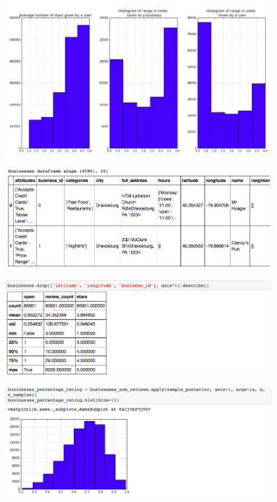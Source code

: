 \documentclass[11pt]{article}
\begin{document}
\begin{figure}[!htb]
\centering
\includegraphics[width=0.9\textwidth]{./ac209/avgstarsusersbusinesses-filter.png}
\end{figure}

\begin{figure}[!htb]
\centering
\includegraphics[width=0.9\textwidth]{./ac209/bizdataframe.png}
\end{figure}

\begin{figure}[!htb]
\centering
\includegraphics[width=0.9\textwidth]{./ac209/bizdescribe.png}
\end{figure}

\begin{figure}[!htb]
\centering
\includegraphics[width=0.9\textwidth]{./ac209/businessespctrating.png}
\end{figure}
\end{document}

